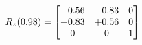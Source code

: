 \documentclass[preview]{standalone}
\begin{document}
\begin{align*}
\special{dvisvgm:raw <g id='unique000'>}R_{z}(0.98) = \begin{bmatrix}+0.56 & -0.83 & 0 \\+0.83 & +0.56 & 0 \\0 & 0 & 1\end{bmatrix}\special{dvisvgm:raw </g>}
\end{align*}
\end{document}
